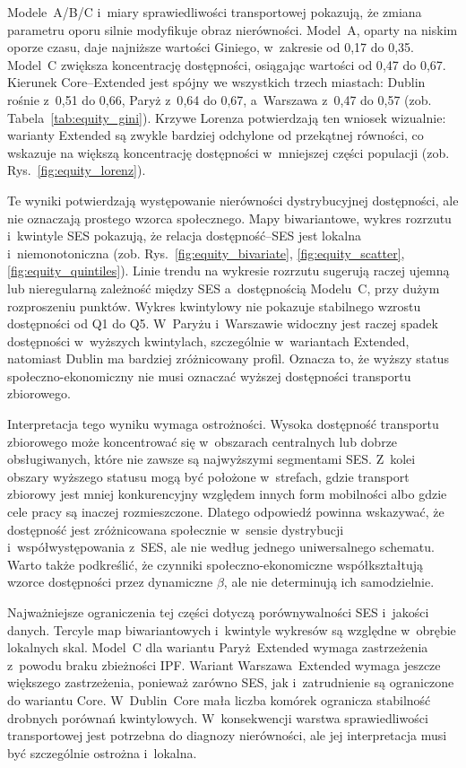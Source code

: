 \documentclass{pracamgr}
\begin{document}
Modele~A/B/C i~miary sprawiedliwości transportowej pokazują, że zmiana parametru oporu silnie modyfikuje obraz nierówności. Model~A, oparty na niskim oporze czasu, daje najniższe wartości Giniego, w~zakresie od 0{,}17 do 0{,}35. Model~C zwiększa koncentrację dostępności, osiągając wartości od 0{,}47 do 0{,}67. Kierunek \mbox{Core--Extended} jest spójny we wszystkich trzech miastach: Dublin rośnie z~0{,}51 do 0{,}66, Paryż z~0{,}64 do 0{,}67, a~Warszawa z~0{,}47 do 0{,}57 (zob. Tabela~\ref{tab:equity_gini}). Krzywe Lorenza potwierdzają ten wniosek wizualnie: warianty \mbox{Extended} są zwykle bardziej odchylone od przekątnej równości, co wskazuje na większą koncentrację dostępności w~mniejszej części populacji (zob. Rys.~\ref{fig:equity_lorenz}).

Te wyniki potwierdzają występowanie nierówności dystrybucyjnej dostępności, ale nie oznaczają prostego wzorca społecznego. Mapy biwariantowe, wykres rozrzutu i~kwintyle \mbox{SES} pokazują, że relacja dostępność--\mbox{SES} jest lokalna i~niemonotoniczna (zob. Rys.~\ref{fig:equity_bivariate}, \ref{fig:equity_scatter}, \ref{fig:equity_quintiles}). Linie trendu na wykresie rozrzutu sugerują raczej ujemną lub nieregularną zależność między \mbox{SES} a~dostępnością Modelu~C, przy dużym rozproszeniu punktów. Wykres kwintylowy nie pokazuje stabilnego wzrostu dostępności od \mbox{Q1} do \mbox{Q5}. W~Paryżu i~Warszawie widoczny jest raczej spadek dostępności w~wyższych kwintylach, szczególnie w~wariantach \mbox{Extended}, natomiast Dublin ma bardziej zróżnicowany profil. Oznacza to, że wyższy status społeczno-ekonomiczny nie musi oznaczać wyższej dostępności transportu zbiorowego.

Interpretacja tego wyniku wymaga ostrożności. Wysoka dostępność transportu zbiorowego może koncentrować się w~obszarach centralnych lub dobrze obsługiwanych, które nie zawsze są najwyższymi segmentami \mbox{SES}. Z~kolei obszary wyższego statusu mogą być położone w~strefach, gdzie transport zbiorowy jest mniej konkurencyjny względem innych form mobilności albo gdzie cele pracy są inaczej rozmieszczone. Dlatego odpowiedź powinna wskazywać, że dostępność jest zróżnicowana społecznie w~sensie dystrybucji i~współwystępowania z~\mbox{SES}, ale nie według jednego uniwersalnego schematu. Warto także podkreślić, że czynniki społeczno-ekonomiczne współkształtują wzorce dostępności przez dynamiczne $\beta$, ale nie determinują ich samodzielnie.

Najważniejsze ograniczenia tej części dotyczą porównywalności \mbox{SES} i~jakości danych. Tercyle map biwariantowych i~kwintyle wykresów są względne w~obrębie lokalnych skal. Model~C dla wariantu \mbox{Paryż~Extended} wymaga zastrzeżenia z~powodu braku zbieżności \mbox{IPF}. Wariant \mbox{Warszawa~Extended} wymaga jeszcze większego zastrzeżenia, ponieważ zarówno \mbox{SES}, jak i~zatrudnienie są ograniczone do wariantu \mbox{Core}. W~\mbox{Dublin~Core} mała liczba komórek ogranicza stabilność drobnych porównań kwintylowych. W~konsekwencji warstwa sprawiedliwości transportowej jest potrzebna do diagnozy nierówności, ale jej interpretacja musi być szczególnie ostrożna i~lokalna.
\end{document}
